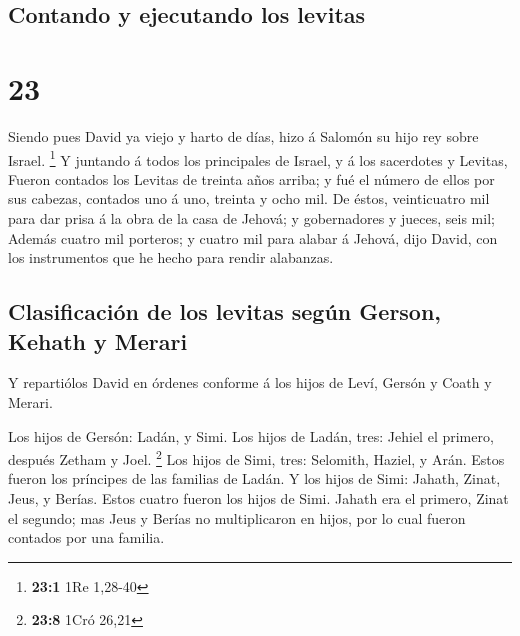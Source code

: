 \hypertarget{contando-y-ejecutando-los-levitas}{%
\subsection{Contando y ejecutando los
levitas}\label{contando-y-ejecutando-los-levitas}}

\hypertarget{section-22}{%
\section{23}\label{section-22}}

 Siendo pues David ya viejo y harto de días, hizo á
Salomón su hijo rey sobre Israel. \footnote{\textbf{23:1} 1Re 1,28-40}
 Y juntando á todos los principales de Israel, y á los
sacerdotes y Levitas,  Fueron contados los Levitas de
treinta años arriba; y fué el número de ellos por sus cabezas, contados
uno á uno, treinta y ocho mil.  De éstos, veinticuatro mil
para dar prisa á la obra de la casa de Jehová; y gobernadores y jueces,
seis mil;  Además cuatro mil porteros; y cuatro mil para
alabar á Jehová, dijo David, con los instrumentos que he hecho para
rendir alabanzas.

\hypertarget{clasificaciuxf3n-de-los-levitas-seguxfan-gerson-kehath-y-merari}{%
\subsection{Clasificación de los levitas según Gerson, Kehath y
Merari}\label{clasificaciuxf3n-de-los-levitas-seguxfan-gerson-kehath-y-merari}}

 Y repartiólos David en órdenes conforme á los hijos de
Leví, Gersón y Coath y Merari.

 Los hijos de Gersón: Ladán, y Simi.  Los
hijos de Ladán, tres: Jehiel el primero, después Zetham y Joel.
\footnote{\textbf{23:8} 1Cró 26,21}  Los hijos de Simi,
tres: Selomith, Haziel, y Arán. Estos fueron los príncipes de las
familias de Ladán.  Y los hijos de Simi: Jahath, Zinat,
Jeus, y Berías. Estos cuatro fueron los hijos de Simi. 
Jahath era el primero, Zinat el segundo; mas Jeus y Berías no
multiplicaron en hijos, por lo cual fueron contados por una familia.

